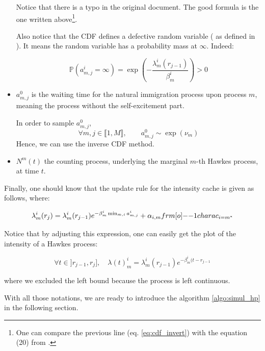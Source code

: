 \begin{itemize}
Notice that there is a typo in the original document. The good formula is the one written above\footnote{One can compare the previous line (eq. \ref{eq:cdf_invert}) with the equation (20) from \cite{my_algo_simul}.}.

Also notice that the CDF defines a defective random variable ( as defined in \cite{my_algo_simul}). It means the random variable has a probability mass at $\infty$. Indeed:

$$ \mathbb P ( a^i_{m,j} = \infty ) = \exp \left ( - \frac { \lambda^i_m ( r_{j-1} ) } { \beta_m^i } \right ) > 0 $$



\item $a_{m,j}^0$ is the waiting time for the natural immigration process upon process $m$, meaning the process without the self-excitement part. 

\begin{remarque}
In order to sample $a^0_{m,j}$,
$$\forall m,j \in  \llbracket 1, M \rrbracket, \qquad a_{m,j}^0 \sim \exp( \nu_m )$$
Hence, we can use the inverse CDF method. 
\end{remarque}

\item $N^{m} (t) $ the counting process, underlying the marginal $m$-th Hawkes process, at time $t$.
\end{itemize}


Finally, one should know that the update rule for the intensity cache is given as follows, where:

\begin{equation}
\lambda_m^i ( r_j ) = \lambda_m^i ( r_{j-1} )  e^{ - \beta_m^i \min_{m,i} a_{m,j}^i } + \alpha_{i,m} \11charac_{i = m^*}
\label{eq:update_lambda} 
\end{equation}

Notice that by adjusting this expression, one can easily get the plot of the intensity of a Hawkes process:

\begin{equation}
\label{eq:update_lambda_plot} 
\forall t \in ]r_{j-1}, r_j ], \quad \lambda (t)_m^i = \lambda_m^i ( r_{j-1} )  e^{ - \beta_m^i ( t - r_{j-1} }
\end{equation} 

where we excluded the left bound because the process is left continuous.
 
With all those notations, we are ready to introduce the algorithm \ref{algo:simul_hp} in the following section.









